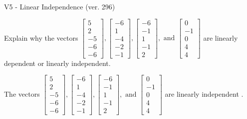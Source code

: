 \begin{exercise}
  \begin{exerciseTitle}V5 - Linear Independence (ver. 296)\end{exerciseTitle}
  \begin{exerciseStatement}
    Explain why the vectors \(\left[\begin{array}{r}
5 \\
2 \\
-5 \\
-6 \\
-6
\end{array}\right] , \left[\begin{array}{r}
-6 \\
1 \\
-4 \\
-2 \\
-1
\end{array}\right] , \left[\begin{array}{r}
-6 \\
-1 \\
1 \\
-1 \\
2
\end{array}\right] , \text{ and } \left[\begin{array}{r}
0 \\
-1 \\
0 \\
4 \\
4
\end{array}\right]\) are linearly dependent or linearly independent.	


  \end{exerciseStatement}
  \begin{exerciseAnswer}
   The vectors \(\left[\begin{array}{r}
5 \\
2 \\
-5 \\
-6 \\
-6
\end{array}\right] , \left[\begin{array}{r}
-6 \\
1 \\
-4 \\
-2 \\
-1
\end{array}\right] , \left[\begin{array}{r}
-6 \\
-1 \\
1 \\
-1 \\
2
\end{array}\right] , \text{ and } \left[\begin{array}{r}
0 \\
-1 \\
0 \\
4 \\
4
\end{array}\right]\) are 
  	 linearly independent  .
  


  \end{exerciseAnswer}
\end{exercise}